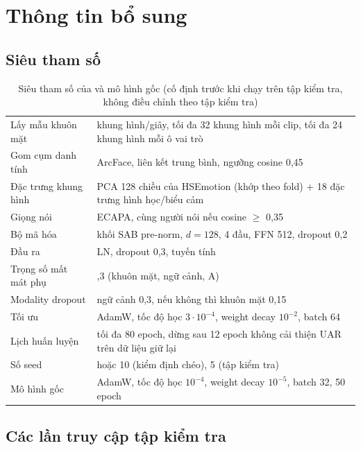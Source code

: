 \chapter{Thông tin bổ sung}

\section{Siêu tham số}
\label{app:hparams}

\begin{table}[!htb]
\centering
\caption{Siêu tham số của \model{} và mô hình gốc (cố định trước khi chạy trên tập kiểm tra, không điều chỉnh theo tập kiểm tra)}
\label{tab:hparams}
{\fontsize{12}{14}\selectfont
\begin{tabular}{>{\raggedright}p{4.5cm}>{\raggedright\arraybackslash}p{10cm}}
\toprule
Lấy mẫu khuôn mặt & 4 khung hình/giây, tối đa 32 khung hình mỗi clip, tối đa 24 khung hình mỗi ô vai trò \\
Gom cụm danh tính & ArcFace, liên kết trung bình, ngưỡng cosine 0,45 \\
Đặc trưng khung hình & PCA 128 chiều của HSEmotion (khớp theo fold) + 18 đặc trưng hình học/biểu cảm \\
Giọng nói & ECAPA, cùng người nói nếu cosine $\ge$ 0,35 \\
Bộ mã hóa & 2 khối SAB pre-norm, $d = 128$, 4 đầu, FFN 512, dropout 0,2 \\
Đầu ra & LN, dropout 0,3, tuyến tính \\
Trọng số mất mát phụ & 0,3 (khuôn mặt, ngữ cảnh, A) \\
Modality dropout & ngữ cảnh 0,3, nếu không thì khuôn mặt 0,15 \\
Tối ưu & AdamW, tốc độ học $3\cdot10^{-4}$, weight decay $10^{-2}$, batch 64 \\
Lịch huấn luyện & tối đa 80 epoch, dừng sau 12 epoch không cải thiện UAR trên dữ liệu giữ lại \\
Số seed & 5 hoặc 10 (kiểm định chéo), 5 (tập kiểm tra) \\
Mô hình gốc & AdamW, tốc độ học $10^{-4}$, weight decay $10^{-5}$, batch 32, 50 epoch \\
\bottomrule
\end{tabular}}
\end{table}

\section{Các lần truy cập tập kiểm tra}
\label{app:access}

